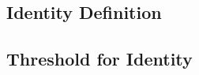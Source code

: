 \documentclass[
	letterpaper, %
]{jdf}
\begin{document}


\subsection{Identity Definition}
\subsection{Threshold for Identity}
\end{document}
